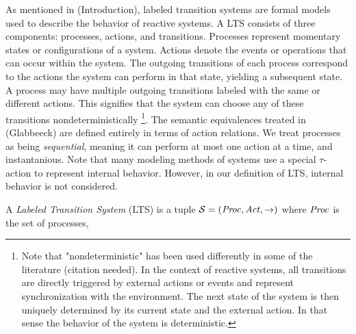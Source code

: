 %
\begin{isabellebody}%
%
%
\isadelimtheory
%
\endisadelimtheory
%
\isatagtheory
%
\endisatagtheory
{\isafoldtheory}%
%
\isadelimtheory
%
\endisadelimtheory
%
\isadelimdocument
%
\endisadelimdocument
%
\isatagdocument
%
\isamarkuptrue%
%
\endisatagdocument
{\isafolddocument}%
%
\isadelimdocument
%
\endisadelimdocument
%
\begin{isamarkuptext}%
\label{sec:LTS}%
\end{isamarkuptext}\isamarkuptrue%
%
\begin{isamarkuptext}%
As mentioned in (Introduction), labeled transition systems are formal models used to describe the behavior of reactive systems.
A LTS consists of three components: processes, actions, and transitions. Processes represent momentary states or configurations of a system. Actions denote the events or operations that can occur within the system.
The outgoing transitions of each process correspond to the actions the system can perform in that state, yielding a subsequent state.
A process may have multiple outgoing transitions labeled with the same or different actions. This signifies that the system can choose any of these transitions nondeterministically
\footnote{Note that "nondeterministic" has been used  differently in some of the literature (citation needed). In the context of reactive systems, 
all transitions are directly triggered by external actions or events and represent synchronization with the environment.
The next state of the system is then uniquely determined by its current state and the external action. In that sense the behavior of the system is deterministic.}.
The semantic equivalences treated in (Glabbeeck) are defined entirely in terms of action relations.
We treat processes as being \textit{sequential}, meaning it can perform at most one action at a time, and instantanious.
Note that many modeling methods of systems use a special $\tau$-action to represent internal behavior. However, in our definition of LTS, 
internal behavior is not considered.%
\end{isamarkuptext}\isamarkuptrue%
%
\isadelimdocument
%
\endisadelimdocument
%
\isatagdocument
%
\isamarkuptrue%
%
\endisatagdocument
{\isafolddocument}%
%
\isadelimdocument
%
\endisadelimdocument
%
\begin{isamarkuptext}%
A \textit{Labeled Transition System} (LTS) is a tuple $\mathcal{S} = (\mathit{Proc}, \mathit{Act}, \rightarrow)$ where $\mathit{Proc}$ is the set of processes, 

\end{isamarkuptext}
\end{isabellebody}

